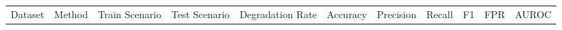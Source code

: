 \begin{tabular}{lllllllllll}
Dataset & Method & Train Scenario & Test Scenario & Degradation Rate & Accuracy & Precision & Recall & F1 & FPR & AUROC\\
\end{tabular}
